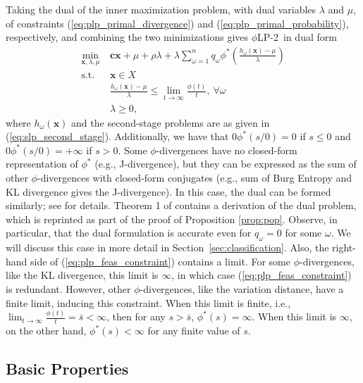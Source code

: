 \documentclass[opre,nonblindrev]{informs3} %
\newcommand{\x}{\mathbf{x}}
\renewcommand{\c}{\mathbf{c}}
\newcommand{\st}{\mbox{s.t.}}
\newcommand{\plp}{$\phi$LP-2}
\begin{document}
Taking the dual of the inner maximization problem, with dual variables $\lambda$ and $\mu$, of constraints (\ref{eq:plp_primal_divergence}) and (\ref{eq:plp_primal_probability}), respectively, and combining the two minimizations gives \plp\ in dual form
\begin{align}
	\min_{\x,\lambda,\mu} \ & \c\x + \mu + \rho \lambda + \lambda \sum_{\omega=1}^{n} q_\omega \phi^*\left(\frac{h_\omega(\x) - \mu}{\lambda}\right) \label{eq:plp_two_stage} \\
	\st \ & \x \in X \nonumber \\
	& \frac{h_\omega(\x) - \mu}{\lambda} \leq \lim_{t \rightarrow \infty} \frac{\phi(t)}{t}, \ \forall \omega \label{eq:plp_feas_constraint}\\
	& \lambda \geq 0, \nonumber
\end{align}
where $h_\omega(\x)$ and the second-stage problems are as given in (\ref{eq:slp_second_stage}). 
Additionally, we have that $0\phi^*(s/0)=0$ if $s\leq 0$ and  $0\phi^*(s/0)=+\infty$ if $s > 0$.
Some $\phi$-divergences have no closed-form representation of $\phi^*$ (e.g., J-divergence), but they can be expressed as the sum of other $\phi$-divergences with closed-form conjugates (e.g., sum of Burg Entropy and KL divergence gives the J-divergence). 
In this case, the dual can be formed similarly; see \citep{bental2011robust} for details.
Theorem 1 of \citep{bental2011robust} contains a derivation of the dual problem, which is reprinted as part of the proof of Proposition \ref{prop:pop}.
Observe, in particular, that the dual formulation is accurate even for $q_\omega = 0$ for some $\omega$.
We will discuss this case in more detail in Section~\ref{sec:classification}. 
Also, the right-hand side of (\ref{eq:plp_feas_constraint}) contains a limit.
For some $\phi$-divergences, like the KL divergence, this limit is $\infty$, in which case (\ref{eq:plp_feas_constraint}) is redundant.
However, other $\phi$-divergences, like the variation distance, have a finite limit, inducing this constraint.
When this limit is finite, i.e., $\lim_{t \rightarrow \infty} \frac{\phi(t)}{t}=  \bar{s}<\infty$, then for any $s> \bar{s}$, $\phi^*(s)=\infty$. 
When this limit is $\infty$, on the other hand, $\phi^*(s)<\infty$ for any finite value of $s$. 


\subsection{Basic Properties}
\label{ssec:basicprop}
\end{document}
